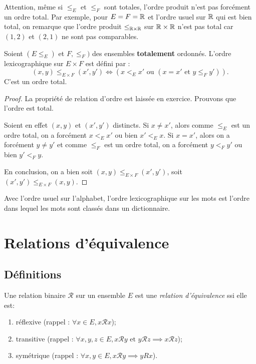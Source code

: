 Attention, même si $\leq_E$ et $\leq_F$ sont totales, l'ordre produit n'est pas forcément un ordre total. Par exemple, pour $E=F=\mathbb{R}$ et l'ordre usuel sur $\mathbb{R}$ qui est bien total, on remarque que l'ordre produit $\leq_{\mathbb{R}\times\mathbb{R}}$ sur $\mathbb{R}\times \mathbb{R}$ n'est pas total car $(1,2)$ et $(2,1)$ ne sont pas comparables.

\begin{propdef}
Soient $(E\leq_E)$ et $F,\leq_F)$ des ensembles \textbf{totalement} ordonnés.
L'ordre lexicographique sur $E\times F$ est défini par :
\[
(x,y) \leq_{E\times F} (x',y') \iff \left(x<_E x' \text{ ou } (x=x' \text{ et } y\leq_F y')\right).
\]
C'est un ordre total.
\end{propdef}
\begin{proof}
La propriété de relation d'ordre est laissée en exercice. Prouvons que l'ordre est total.

Soient en effet $(x,y)$ et $(x',y')$ distincts.
Si $x\neq x'$, alors comme $\leq_E$ est un ordre total, on a forcément $x<_E x'$ ou bien $x'<_E x$.
Si $x=x'$, alors on a forcément $y\neq y'$ et comme $\leq_F$ est un ordre total, on a forcément $y <_F y'$ ou bien $y'<_F y$.

En conclusion, on a bien soit $(x,y) \leq_{E\times F} (x',y')$, soit  $(x',y') \leq_{E\times F} (x,y)$.
\end{proof}

\begin{exemple}Avec l'ordre usuel sur l'alphabet, l'ordre lexicographique sur les mots est l'ordre dans lequel les mots sont classés dans un dictionnaire.
\end{exemple}













\section{Relations d'équivalence}

\subsection{Définitions}

\begin{definition}
Une relation binaire ${\mathcal R}$ sur un ensemble $E$ est une \emph{relation d'équivalence} ssi elle est:
\begin{enumerate}
\item réflexive (rappel : $\forall x\in E, x{\mathcal R}x$);
\item transitive (rappel : $\forall x, y, z\in E, x{\mathcal R}y\text{ et } y{\mathcal R}z \implies x{\mathcal R}z$);
\item symétrique (rappel : $\forall x, y\in E, x{\mathcal R}y \implies yRx$).
\end{enumerate}
\end{definition}


